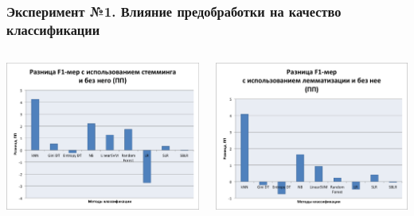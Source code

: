 \documentclass{beamer}
\begin{document}
\begin{frame}
\frametitle{Эксперимент №1. Влияние предобработки на качество классификации}
\begin{columns}[T]
    \begin{column}{.5\textwidth}
    \includegraphics[width=\linewidth,height=\textheight,keepaspectratio, trim=4 4 4 4, clip]{stemming-diff.png}
    \end{column}
    \begin{column}{.5\textwidth}
    \includegraphics[width=\linewidth,height=\textheight,keepaspectratio, trim=4 4 4 4, clip]{lemmatizing-diff.png}
    \end{column}
  \end{columns}
\end{frame}
\end{document}
